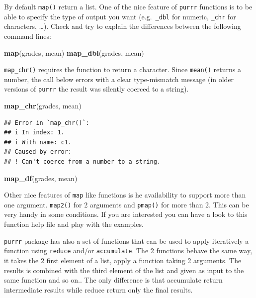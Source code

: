 \documentclass[
]{book}
\newenvironment{Shaded}{\begin{snugshade}}{\end{snugshade}}
\newcommand{\FunctionTok}[1]{\textcolor[rgb]{0.13,0.29,0.53}{\textbf{#1}}}
\newcommand{\NormalTok}[1]{#1}
\begin{document}
By default \texttt{map()} return a list. One of the nice feature of \texttt{purrr} functions is to be able to specify the type of output you want (e.g.~\texttt{\_dbl} for numeric, \texttt{\_chr} for characters, \ldots).
Check and try to explain the differences between the following command lines:

\begin{Shaded}
\begin{Highlighting}[]
\FunctionTok{map}\NormalTok{(grades, mean)}
\FunctionTok{map\_dbl}\NormalTok{(grades, mean)}
\end{Highlighting}
\end{Shaded}

\texttt{map\_chr()} requires the function to return a character. Since \texttt{mean()} returns
a number, the call below errors with a clear type-mismatch message (in older
versions of \texttt{purrr} the result was silently coerced to a string).

\begin{Shaded}
\begin{Highlighting}[]
\FunctionTok{map\_chr}\NormalTok{(grades, mean)}
\end{Highlighting}
\end{Shaded}

\begin{verbatim}
## Error in `map_chr()`:
## i In index: 1.
## i With name: c1.
## Caused by error:
## ! Can't coerce from a number to a string.
\end{verbatim}

\begin{Shaded}
\begin{Highlighting}[]
\FunctionTok{map\_df}\NormalTok{(grades, mean)}
\end{Highlighting}
\end{Shaded}

Other nice features of \texttt{map} like functions is he availability to support more than one argument.
\texttt{map2()} for 2 arguments and \texttt{pmap()} for more than 2. This can be very handy in some conditions.
If you are interested you can have a look to this function help file and play with the examples.

\texttt{purrr} package has also a set of functions that can be used to apply iteratively a function using \texttt{reduce} and/or \texttt{accumulate}. The 2 functions behave the same way, it takes the 2 first element of a list, apply a function taking 2 arguments. The results is combined with the third element of the list and given as input to the same function and so on.. The only difference is that accumulate return intermediate results while reduce return only the final results.
\end{document}
